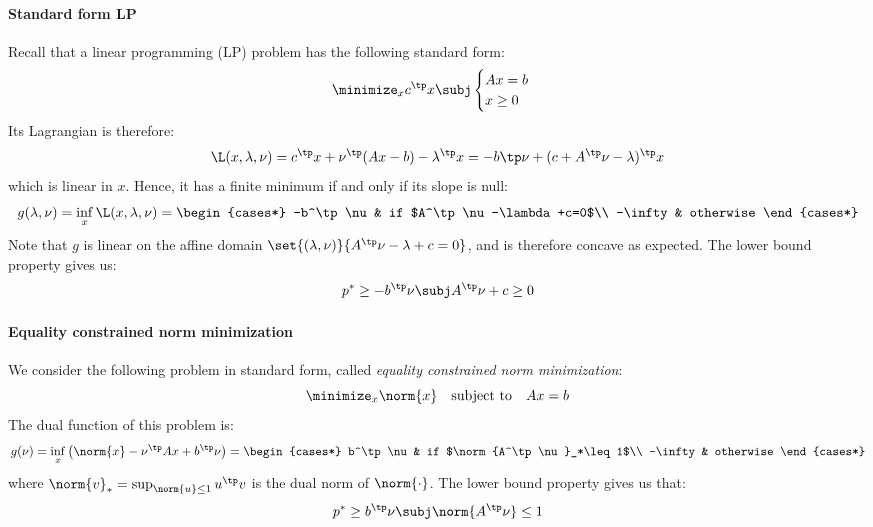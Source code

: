 \paragraph*{Standard form LP}
Recall that a linear programming (LP) problem has the following standard form:
\begin{equation*}
    \minimize_x c^\tp x \subj \begin{cases}
        Ax=b\\
        x\geq0
    \end{cases}
\end{equation*}
Its Lagrangian is therefore:
\begin{equation*}
    \L(x, \lambda,\nu) = c^\tp x + \nu^\tp(Ax-b)-\lambda^\tp x = -b\tp\nu + (c+A^\tp\nu-\lambda)^\tp x
\end{equation*}
which is linear in $x$. Hence, it has a finite minimum if and only if its slope is null:
\begin{equation*}
    g(\lambda,\nu)=\inf_x\L(x,\lambda,\nu) = \begin{cases*}
        -b^\tp\nu & if $A^\tp\nu-\lambda+c=0$\\
        -\infty & otherwise
    \end{cases*}
\end{equation*}
Note that $g$ is linear on the affine domain $\set{(\lambda,\nu)}{A^\tp\nu-\lambda+c=0}$, and is therefore concave as expected. The lower bound property gives us:
\begin{equation*}
    p^*\geq-b^\tp\nu \subj A^\tp\nu+c\geq0
\end{equation*}

\paragraph*{Equality constrained norm minimization}
We consider the following problem in standard form, called \emph{equality constrained norm minimization}:
\begin{equation*}
    \minimize_x \norm{x} \quad\text{subject to}\quad Ax=b
\end{equation*}
The dual function of this problem is:
\begin{equation*}
    g(\nu)=\inf_x\left(\norm{x}-\nu^\tp Ax+b^\tp\nu\right) = \begin{cases*}
        b^\tp\nu & if $\norm{A^\tp\nu}_*\leq1$\\
        -\infty & otherwise
    \end{cases*}
\end{equation*}
where $\norm{v}_*=\sup_{\norm{u}\leq1}u^\tp v$ is the dual norm of $\norm{\cdot}$. The lower bound property gives us that:
\begin{equation*}
    p^* \geq b^\tp\nu \subj \norm{A^\tp\nu}\leq1
\end{equation*}

